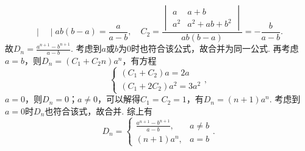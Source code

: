 \documentclass[12pt,fontset=fandol]{ctexart}
\begin{document}
\begin{solve}
\begin{enumerate}
\[{\begin{vmatrix}
                                \end{vmatrix}}{ab(b-a)}=\frac{a}{a-b},\quad
                            C_2=\frac{\begin{vmatrix}
                                    a   & a+b        \\
                                    a^2 & a^2+ab+b^2
                                \end{vmatrix}}{ab(b-a)}=-\frac{b}{a-b}.\]
                        故$D_n=\displaystyle\frac{a^{n+1}-b^{n+1}}{a-b}$. 考虑到$a$或$b$为0时也符合该公式，故合并为同一公式. 再考虑$a=b$，则$D_n=(C_1+C_2n)a^n$，有方程
                        \[\begin{cases}
                                (C_1+C_2)a=2a \\
                                (C_1+2C_2)a^2=3a^2
                            \end{cases},\]
                        $a=0$，则$D_n=0$；$a\neq 0$，可以解得$C_1=C_2=1$，有$D_n=(n+1)a^n$. 考虑到$a=0$时$D_n$也符合该式，故合并. 综上有
                        \[D_n=\begin{cases}
                                \displaystyle\frac{a^{n+1}-b^{n+1}}{a-b}, & a\neq b \\
                                (n+1)a^n,                                 & a=b
                            \end{cases}.\]


\end{enumerate}
\end{solve}
\end{document}
